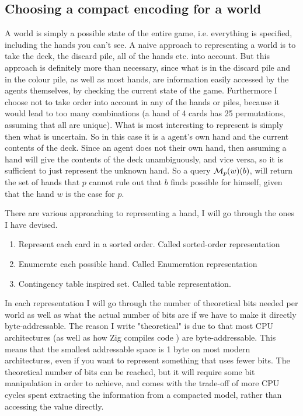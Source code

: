 \subsection{Choosing a compact encoding for a world} \label{sec:representing-a-world}
A world is simply a possible state of the entire game, i.e. everything is specified, including the hands you can't see. A naive approach to representing a world is to take the deck, the discard pile, all of the hands etc. into account. But this approach is definitely more than necessary, since what is in the discard pile and in the colour pile, as well as most hands, are information easily accessed by the agents themselves, by checking the current state of the game. Furthermore I choose not to take order into account in any of the hands or piles, because it would lead to too many combinations (a hand of 4 cards has 25 permutations, assuming that all are unique). What is most interesting to represent is simply then what is uncertain. So in this case it is a agent's own hand and the current contents of the deck. Since an agent does not their own hand, then assuming a hand will give the contents of the deck unambiguously, and vice versa, so it is sufficient to just represent the unknown hand. So a query $\mathcal{M}_p(w)(b)$, will return the set of hands that $p$ cannot rule out that $b$ finds possible for himself, given that the hand $w$ is the case for $p$.

There are various approaching to representing a hand, I will go through the ones I have devised. 

\begin{enumerate}
\item Represent each card in a sorted order. Called sorted-order representation
\item Enumerate each possible hand. Called Enumeration representation
\item Contingency table inspired set. Called table representation.
\end{enumerate}

In each representation I will go through the number of theoretical bits needed per world as well as what the actual number of bits are if we have to make it directly byte-addressable. The reason I write "theoretical" is due to that most CPU architectures (as well as how Zig compiles code \cite{zigdocspackedstruct}) are byte-addressable. This means that the smallest addressable space is 1 byte on most modern architectures, even if you want to represent something that uses fewer bits. The theoretical number of bits can be reached, but it will require some bit manipulation in order to achieve, and comes with the trade-off of more CPU cycles spent extracting the information from a compacted model, rather than accessing the value directly. 


